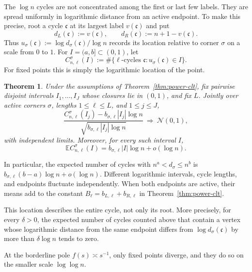 \documentclass[11pt]{article}
\newtheorem{theorem}{Theorem}[section]
\theoremstyle{remark}
\theoremstyle{plain}
\newcommand{\E}{\mathbb E}
\begin{document}
The $\log n$ cycles are not concentrated among the first or last few labels.
They are spread uniformly in logarithmic distance from an active endpoint.
To make this precise, root a cycle $\mathfrak c$ at its largest label
$v(\mathfrak c)$ and put
\[
 d_L(\mathfrak c):=v(\mathfrak c),
 \qquad d_R(\mathfrak c):=n+1-v(\mathfrak c).
\]
Thus $u_\sigma(\mathfrak c):=\log d_\sigma(\mathfrak c)/\log n$ records its
location relative to corner $\sigma$ on a scale from $0$ to $1$.  For
$I=(a,b]\subset(0,1)$, let
\begin{equation}\label{eq:spatial-cycle-count}
 C_{n,\ell}^{\sigma}(I)
 :=\#\{\ell\text{-cycles }\mathfrak c:u_\sigma(\mathfrak c)\in I\}.
\end{equation}
For fixed points this is simply the logarithmic location of the point.

\begin{theorem}
\label{thm:power-spatial}
Under the assumptions of Theorem~\ref{thm:power-clt}, fix pairwise disjoint
intervals $I_1,\ldots,I_J$ whose closures lie in $(0,1)$, and fix $L$.
Jointly over active corners $\sigma$, lengths $1\le\ell\le L$, and
$1\le j\le J$,
\begin{equation}\label{eq:power-spatial-clt}
 \frac{C_{n,\ell}^{\sigma}(I_j)
   -b_{\sigma,\ell}|I_j|\log n}
  {\sqrt{b_{\sigma,\ell}|I_j|\log n}}
 \ \Longrightarrow\ \mathcal N(0,1),
\end{equation}
with independent limits.  Moreover, for every such interval $I$,
\begin{equation}\label{eq:power-spatial-mean}
 \E C_{n,\ell}^{\sigma}(I)
 =b_{\sigma,\ell}|I|\log n+o(\log n).
\end{equation}
\end{theorem}

In particular, the expected number of cycles with
$n^a<d_\sigma\le n^b$ is
$b_{\sigma,\ell}(b-a)\log n+o(\log n)$.  Different logarithmic intervals,
cycle lengths, and endpoints fluctuate independently.  When both endpoints
are active, their means add to the constant
$B_\ell=b_{L,\ell}+b_{R,\ell}$ in Theorem~\ref{thm:power-clt}.

This location describes the entire cycle, not only its root.  More precisely,
for every $\delta>0$, the expected number of cycles counted above that contain
a vertex whose logarithmic distance from the same endpoint differs from
$\log d_\sigma(\mathfrak c)$ by more than $\delta\log n$ tends to zero.

At the borderline pole $f(s)\asymp s^{-1}$, only fixed points diverge, and
they do so on the smaller scale $\log\log n$.
\end{document}
